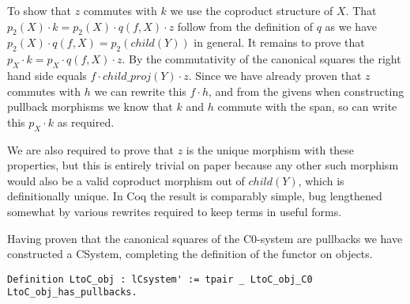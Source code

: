To show that $z$ commutes with $k$ we use the coproduct structure of $X$. That
$p_2(X)\cdot k = p_2(X)\cdot q(f, X)\cdot z$ follow from the definition of $q$
as we have $p_2(X)\cdot q(f, X) = p_2(child(Y))$ in general. It remains to prove
that $p_X\cdot k = p_X\cdot q(f, X)\cdot z$. By the commutativity of the
canonical squares the right hand side equals $f\cdot child\_proj(Y)\cdot z$.
Since we have already proven that $z$ commutes with $h$ we can rewrite this
$f\cdot h$, and from the givens when constructing pullback morphisms we know
that $k$ and $h$ commute with the span, so can write this $p_X\cdot k$ as
required.

We are also required to prove that $z$ is the unique morphism with these
properties, but this is entirely trivial on paper because any other such
morphism would also be a valid coproduct morphism out of $child(Y)$, which is
definitionally unique. In Coq the result is comparably simple, bug lengthened
somewhat by various rewrites required to keep terms in useful forms.

Having proven that the canonical squares of the C0-system are pullbacks we have
constructed a CSystem, completing the definition of the functor on objects.
\begin{lstlisting}
Definition LtoC_obj : lCsystem' := tpair _ LtoC_obj_C0 LtoC_obj_has_pullbacks.
\end{lstlisting}